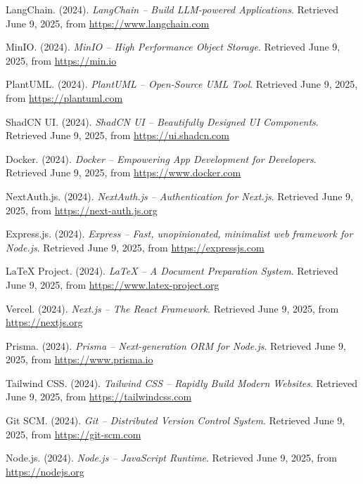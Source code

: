 \begin{thebibliography}{99}

 
    LangChain. (2024). \textit{LangChain – Build LLM-powered Applications}. Retrieved June 9, 2025, from \url{https://www.langchain.com}

    MinIO. (2024). \textit{MinIO – High Performance Object Storage}. Retrieved June 9, 2025, from \url{https://min.io}

    PlantUML. (2024). \textit{PlantUML – Open-Source UML Tool}. Retrieved June 9, 2025, from \url{https://plantuml.com}

    ShadCN UI. (2024). \textit{ShadCN UI – Beautifully Designed UI Components}. Retrieved June 9, 2025, from \url{https://ui.shadcn.com}

    Docker. (2024). \textit{Docker – Empowering App Development for Developers}. Retrieved June 9, 2025, from \url{https://www.docker.com}

    NextAuth.js. (2024). \textit{NextAuth.js – Authentication for Next.js}. Retrieved June 9, 2025, from \url{https://next-auth.js.org}

    Express.js. (2024). \textit{Express – Fast, unopinionated, minimalist web framework for Node.js}. Retrieved June 9, 2025, from \url{https://expressjs.com}

    LaTeX Project. (2024). \textit{LaTeX – A Document Preparation System}. Retrieved June 9, 2025, from \url{https://www.latex-project.org}

    Vercel. (2024). \textit{Next.js – The React Framework}. Retrieved June 9, 2025, from \url{https://nextjs.org}

    Prisma. (2024). \textit{Prisma – Next-generation ORM for Node.js}. Retrieved June 9, 2025, from \url{https://www.prisma.io}

    Tailwind CSS. (2024). \textit{Tailwind CSS – Rapidly Build Modern Websites}. Retrieved June 9, 2025, from \url{https://tailwindcss.com}

    Git SCM. (2024). \textit{Git – Distributed Version Control System}. Retrieved June 9, 2025, from \url{https://git-scm.com}

    Node.js. (2024). \textit{Node.js – JavaScript Runtime}. Retrieved June 9, 2025, from \url{https://nodejs.org}


\end{thebibliography}
